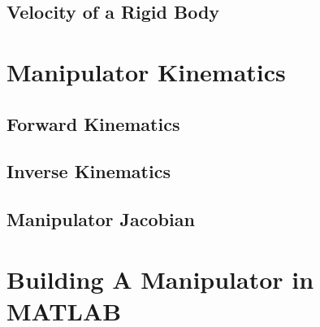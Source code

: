\documentclass[letterpaper]{article}
\begin{document}
\subsection{Velocity of a Rigid Body}

\section{Manipulator Kinematics}

\subsection{Forward Kinematics}

\subsection{Inverse Kinematics}

\subsection{Manipulator Jacobian}

\section{Building A Manipulator in MATLAB}
\end{document}
